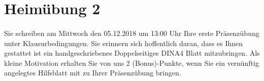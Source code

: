 \section{Heimübung 2}
\paragraph*{}Sie schreiben am Mittwoch den 05.12.2018 um 13:00 Uhr Ihre erste Präsenzübung unter Klausurbedingungen. Sie erinnern sich hoffentlich daran, dass es Ihnen gestattet ist ein handgeschriebenes Doppelseitiges DINA4 Blatt mitzubringen. Als kleine Motivation erhalten Sie von uns 2 (Bonus)-Punkte, wenn Sie ein vernünftig angelegtes Hilfsblatt mit zu Ihrer Präsenzübung bringen.
